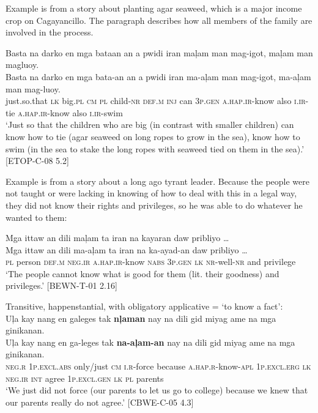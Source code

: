 Example  is from a story about planting agar seaweed, which is a major income crop on Cagayancillo. The paragraph describes how all members of the family are involved in the process.

\ea
\label{ex:knowhowtoswim}
Basta	na	darko	en	mga	bataan	an	a	pwidi	iran	maļam  man	mag-igot,	maļam	man	magluoy. \\\smallskip
\gll Basta	na	darko	en	mga	bata-an	an	a	pwidi	iran	ma-aļam  man	mag-igot,	ma-aļam	man	mag-luoy. \\
just.so.that	\textsc{lk}	big.\textsc{pl}	\textsc{cm}	\textsc{pl}	child-\textsc{nr}	\textsc{def.m}	\textsc{inj}	can	3\textsc{p.gen} \textsc{a.hap.ir}-know  also	\textsc{i.ir}-tie	\textsc{a.hap.ir}-know also \textsc{i.ir}-swim \\
\glt ‘Just so that the children who are big (in contrast with smaller children) can know how to tie (agar seaweed on long ropes to grow in the sea), know how to swim (in the sea to stake the long ropes with seaweed tied on them in the sea).'  [ETOP-C-08 5.2]
\z

Example  is from a story about a long ago tyrant leader. Because the people were not taught or were lacking in knowing of how to deal with this in a legal way, they did not know their rights and privileges, so he was able to do whatever he wanted to them:

\ea
\label{ex:privileges}
Mga	ittaw	an	dili	maļam	ta	iran	na	kayaran	daw pribliyo … \\\smallskip
\gll Mga	ittaw	an	dili	ma-aļam	ta	iran	na	ka-ayad-an	daw pribliyo … \\
\textsc{pl}	person	\textsc{def.m}	\textsc{neg.ir}	\textsc{a.hap.ir}-know	\textsc{nabs}	3\textsc{p.gen}	\textsc{lk}	\textsc{nr}-well-\textsc{nr}	and privilege \\
\glt ‘The people cannot know what is good for them (lit. their goodness) and privileges.’ [BEWN-T-01 2.16]
\z

\ea
Transitive, happenstantial, with obligatory applicative = `to know a fact': \\
Uļa  kay  nang  en  galeges  tak  \textbf{nļaman} nay  na  dili  gid  miyag  ame  na  mga  ginikanan. \\\smallskip
\gll Uļa  kay  nang  en  ga-leges  tak  \textbf{na-aļam-an} nay  na  dili  gid  miyag  ame  na  mga  ginikanan. \\
\textsc{neg.r}  1\textsc{p.excl.abs}  only/just  \textsc{cm}  \textsc{i.r}-force  because  \textsc{a.hap.r}-know-\textsc{apl}
1\textsc{p.excl.erg}   \textsc{lk}  \textsc{neg.ir}  \textsc{int}   agree  1\textsc{p.excl.gen}  \textsc{lk}  \textsc{pl}  parents \\
\glt `We just did not force (our parents to let us go to college) because we knew that our parents really do not agree.’ [CBWE-C-05 4.3]
\z

